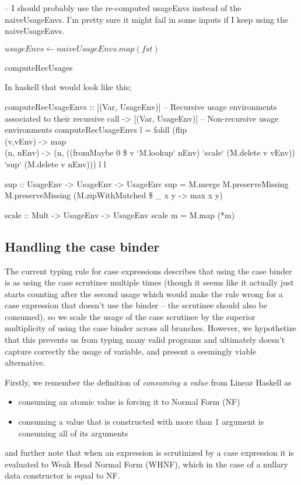 \documentclass[a4paper, draft]{article}
\begin{document}
-- I should probably use the re-computed usageEnvs instead of the
naiveUsageEnvs. I'm pretty sure it might fail in some inputs if I keep using the
naiveUsageEnvs.
\begin{algorithm}
$usageEnvs \gets naiveUsageEnvs.map(fst)$\;
\caption{computeRecUsages}
\end{algorithm}

In haskell that would look like this;
\begin{code}
computeRecUsageEnvs :: [(Var, UsageEnv)] -- Recursive usage environments associated to their recursive call
                    -> [(Var, UsageEnv)] -- Non-recursive usage environments
computeRecUsageEnvs l =
  foldl (flip \\(v,vEnv) -> map \\(n, nEnv) -> (n, ((fromMaybe 0 \$ v `M.lookup` nEnv) `scale` (M.delete v vEnv)) `sup` (M.delete v nEnv))) l l

sup :: UsageEnv -> UsageEnv -> UsageEnv
sup = M.merge M.preserveMissing M.preserveMissing (M.zipWithMatched \$ \_ x y -> max x y)

scale :: Mult -> UsageEnv -> UsageEnv
scale m = M.map (*m)
\end{code}

\subsection{Handling the case binder}

The current typing rule for case expressions describes that using the case
binder is as using the case scrutinee multiple times (though it seems like it
actually just starts counting after the second usage which would make the rule
wrong for a case expression that doesn't use the binder -- the scrutinee should
also be consumed), so we scale the usage of
the case scrutinee by the superior multiplicity of using the case binder across
all branches. However, we hypothetize that this prevents us from typing many
valid programs and ultimately doesn't capture correctly the usage of variable,
and present a seemingly viable alternative.

Firstly, we remember the definition of \emph{consuming a value} from Linear
Haskell as
\begin{itemize}
    \item consuming an atomic value is forcing it to Normal Form (NF)
    \item consuming a value that is constructed with more than 1 argument is
        consuming all of its arguments
\end{itemize}
and further note that when an expression is scrutinized by a case expression it
is evaluated to Weak Head Normal Form (WHNF), which in the case of a nullary data
constructor is equal to NF.
\end{document}
